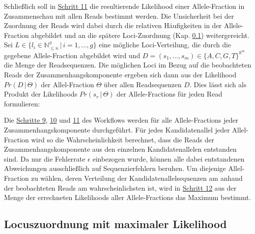 Schließlich soll in \hyperref[step11]{Schritt 11\label{step11txt}} die resultierende Likelihood einer Allele-Fraction in Zusammenschau mit allen Reads bestimmt werden. Die Unsicherheit bei der Zuordnung der Reads wird dabei durch die relativen Häufigkeiten in der Allele-Fraction abgebildet und an die spätere Loci-Zuordnung (Kap. \ref{subsec:sol_loci_lh}) weitergereicht. Sei $L \in \{l_{i} \in \mathds{N}_{\leq n}^\phi \, | \, i=1, \dots, g\}$ eine mögliche Loci-Verteilung, die durch die gegebene Allele-Fraction abgebildet wird und $D = (s_{1}, \dots, s_{m}) \in \{A,C, G, T\}^{k^m}$ die Menge der Readsequenzen. Die möglichen Loci im Bezug auf die beobachteten Reads der Zusammenhangskomponente ergeben sich dann aus der Likelihood $Pr(D \, | \, \Theta)$ der Allel-Fraction $\Theta$ über allen Readsequenzen $D$. Dies lässt sich als Produkt der Likelihoods $Pr(s_{r} \, | \, \Theta)$ der Allele-Fractions für jeden Read formulieren: 
\vspace{-0.5cm}
\begin{center}
\end{center}

Die \hyperref[step9]{Schritte 9}, \hyperref[step10]{10} und \hyperref[step11]{11} des Workflows werden für alle Allele-Fractions jeder Zusammenhangskomponente durchgeführt. Für jedes Kandidatenallel jeder Allel-Fraction wird so die Wahrscheinlichkeit berechnet, dass die Reads der Zusammenhangskomponente aus den einzelnen Kandidatenallelen entstanden sind. Da nur die Fehlerrate $\epsilon$ einbezogen wurde, können alle dabei entstandenen Abweichungen ausschließlich auf Sequenzierfehlern beruhen. Um diejenige Allel-Fraction zu wählen, deren Verteilung der Kandidatenallelsequenzen am anhand der beobachteten Reads am wahrscheinlichsten ist, wird in \hyperref[step12]{Schritt 12\label{step12txt}} aus der Menge der errechneten Likelihoods aller Allele-Fractions das Maximum bestimmt.  

\subsection{Locuszuordnung mit maximaler Likelihood} \label{subsec:sol_loci_lh}

